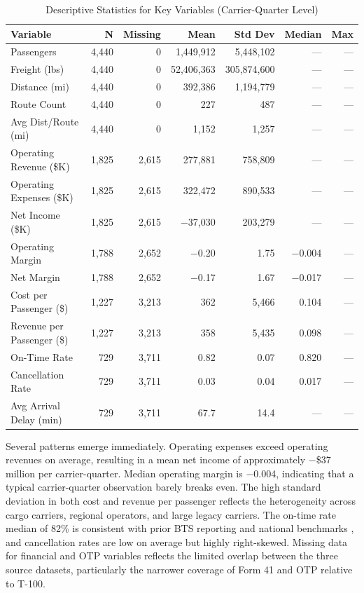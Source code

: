 \documentclass[11pt, letterpaper]{article}
\begin{document}
\begin{table}[H]
\centering
\caption{Descriptive Statistics for Key Variables (Carrier-Quarter Level)}
\label{tab:desc}
\small
\begin{tabular}{lrrrrrr}
\toprule
\textbf{Variable} & \textbf{N} & \textbf{Missing} & \textbf{Mean} & \textbf{Std Dev} & \textbf{Median} & \textbf{Max} \\
\midrule
Passengers              & 4,440 & 0     & 1,449,912   & 5,448,102   & ---      & ---  \\
Freight (lbs)           & 4,440 & 0     & 52,406,363  & 305,874,600 & ---      & ---  \\
Distance (mi)           & 4,440 & 0     & 392,386     & 1,194,779   & ---      & ---  \\
Route Count             & 4,440 & 0     & 227         & 487         & ---      & ---  \\
Avg Dist/Route (mi)     & 4,440 & 0     & 1,152       & 1,257       & ---      & ---  \\
Operating Revenue (\$K) & 1,825 & 2,615 & 277,881     & 758,809     & ---      & ---  \\
Operating Expenses (\$K)& 1,825 & 2,615 & 322,472     & 890,533     & ---      & ---  \\
Net Income (\$K)        & 1,825 & 2,615 & $-$37,030   & 203,279     & ---      & ---  \\
Operating Margin        & 1,788 & 2,652 & $-$0.20     & 1.75        & $-$0.004 & ---  \\
Net Margin              & 1,788 & 2,652 & $-$0.17     & 1.67        & $-$0.017 & ---  \\
Cost per Passenger (\$) & 1,227 & 3,213 & 362         & 5,466       & 0.104    & ---  \\
Revenue per Passenger (\$) & 1,227 & 3,213 & 358       & 5,435       & 0.098    & ---  \\
On-Time Rate            & 729   & 3,711 & 0.82        & 0.07        & 0.820    & ---  \\
Cancellation Rate       & 729   & 3,711 & 0.03        & 0.04        & 0.017    & ---  \\
Avg Arrival Delay (min) & 729   & 3,711 & 67.7        & 14.4        & ---      & ---  \\
\bottomrule
\end{tabular}
\end{table}

Several patterns emerge immediately. Operating expenses exceed operating revenues on average, resulting in a mean net income of approximately $-$\$37 million per carrier-quarter. Median operating margin is $-$0.004, indicating that a typical carrier-quarter observation barely breaks even. The high standard deviation in both cost and revenue per passenger reflects the heterogeneity across cargo carriers, regional operators, and large legacy carriers. The on-time rate median of 82\% is consistent with prior BTS reporting and national benchmarks \cite{bts2026otp}, and cancellation rates are low on average but highly right-skewed. Missing data for financial and OTP variables reflects the limited overlap between the three source datasets, particularly the narrower coverage of Form 41 and OTP relative to T-100.
\end{document}
